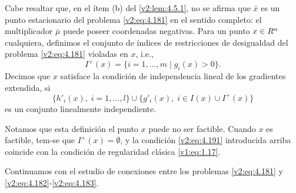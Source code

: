 Cabe resaltar que, en el ítem (b) del \cref{v2:lem:4.5.1}, no se afirma que $\bar{x}$ es un punto estacionario del problema \eqref{v2:eq:4.181} en el sentido completo: el multiplicador $\bar{\mu}$ puede poseer coordenadas negativas. Para un punto $x \in R^n$ cualquiera, definimos el conjunto de índices de restricciones de desigualdad del problema \eqref{v2:eq:4.181} violadas en $x$, i.e.,
\[
    I^+(x) = \{i = 1, \dots, m \mid g_i(x) > 0\}.
\]
Decimos que $x$ satisface la condición de independencia lineal de los gradientes extendida, si
\begin{equation}
    \{h'_i(x), \; i = 1, \dots, l\} \cup \{g'_i(x), \; i \in I(x) \cup I^+(x)\}
    \label{v2:eq:4.191}
\end{equation}
es un conjunto linealmente independiente.

Notamos que esta definición el punto $x$ puede no ser factible. Cuando $x$ es factible, tem-se que $I^+(x) = \emptyset$, y la condición \eqref{v2:eq:4.191} introducida arriba coincide con la condición de regularidad clásica \eqref{v1:eq:1.17}.


Continuamos con el estudio de conexiones entre los problemas \eqref{v2:eq:4.181} y \eqref{v2:eq:4.182}-\eqref{v2:eq:4.183}.

